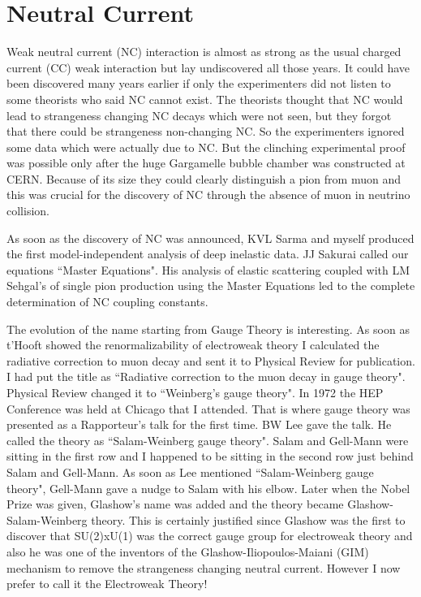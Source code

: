 \section*{Neutral Current}
Weak neutral current (NC) interaction is almost as strong as the usual 
charged current (CC) weak interaction but lay undiscovered all those 
years. It could have been discovered many years earlier if only the 
experimenters did not listen to some theorists who said NC cannot exist. 
The theorists thought that NC would lead to strangeness changing NC 
decays which were not seen, but they forgot that there could be 
strangeness non-changing NC. So the experimenters ignored some data which 
were actually due to NC. But the clinching experimental proof was 
possible only after the huge Gargamelle bubble chamber was constructed 
at CERN. Because of its size they could clearly distinguish a pion 
from muon and this was crucial for the discovery of NC through the 
absence of muon in neutrino collision.
\smallskip

As soon as the discovery of NC was announced, KVL Sarma and myself 
produced the first model-independent analysis of deep inelastic data. JJ 
Sakurai called our equations ``Master Equations". His analysis of elastic 
scattering coupled with LM Sehgal's of single pion production using the 
Master Equations led to the complete determination of NC coupling 
constants.
\smallskip

The evolution of the name starting from Gauge Theory is interesting. As 
soon as t'Hooft showed the renormalizability of electroweak theory I 
calculated the radiative correction to muon decay and sent it to 
Physical Review for publication. I had put the title as ``Radiative 
correction to the muon decay in gauge theory". Physical Review changed 
it to ``Weinberg's gauge theory". In 1972 the HEP Conference was held at 
Chicago that I attended. That is where gauge theory was presented as a 
Rapporteur's talk for the first time. BW Lee gave the talk. He called 
the theory as ``Salam-Weinberg gauge theory". Salam and Gell-Mann were 
sitting in the first row and I happened to be sitting in the second row 
just behind Salam and Gell-Mann. As soon as Lee mentioned 
``Salam-Weinberg gauge theory", Gell-Mann gave a nudge to Salam with his 
elbow. Later when the Nobel Prize was given, Glashow's name was added 
and the theory became Glashow-Salam-Weinberg theory. This is certainly 
justified since Glashow was the first to discover that SU(2)xU(1) was 
the correct gauge group for electroweak theory and also he was one of 
the inventors of the Glashow-Iliopoulos-Maiani (GIM) mechanism to remove 
the strangeness changing neutral current. However I now prefer to call 
it the Electroweak Theory!

